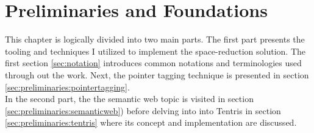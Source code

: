 \chapter{Preliminaries and Foundations}
\label{ch:preliminaries}

This chapter is logically divided into two main parts. The first part presents the tooling and techniques I utilized to implement the space-reduction solution. The first section \ref{sec:notation} introduces common notations and terminologies used through out the work. Next, the pointer tagging technique is presented in section \ref{sec:preliminaries:pointertagging}. \\ 

In the second part, the the semantic web topic is visited in section \ref{sec:preliminaries:semanticweb}) before delving into into Tentris in section \ref{sec:preliminaries:tentris} where its concept and implementation are discussed. 




